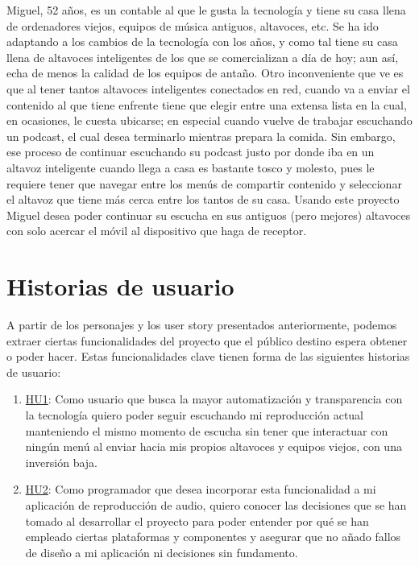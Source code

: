     Miguel, 52 años, es un contable al que le gusta la tecnología y tiene
    su casa llena de ordenadores viejos, equipos de música antiguos, altavoces,
    etc. Se ha ido adaptando a los cambios de la tecnología con los años, y como
    tal tiene su casa llena de altavoces inteligentes de los que se
    comercializan a día de hoy; aun así, echa de menos la calidad de los equipos
    de antaño. Otro inconveniente que ve es que al tener tantos altavoces
    inteligentes conectados en red, cuando va a enviar el contenido al que tiene
    enfrente tiene que elegir entre una extensa lista en la cual, en ocasiones,
    le cuesta ubicarse; en especial cuando vuelve de trabajar escuchando un
    podcast, el cual desea terminarlo mientras prepara la comida. Sin embargo,
    ese proceso de continuar escuchando su podcast justo por donde iba en un
    altavoz inteligente cuando llega a casa es bastante tosco y molesto, pues le
    requiere tener que navegar entre los menús de compartir contenido y
    seleccionar el altavoz que tiene más cerca entre los tantos de su casa.
    Usando este proyecto Miguel desea poder continuar su escucha en sus antiguos
    (pero mejores) altavoces con solo acercar el móvil al dispositivo que haga
    de receptor.



\section{Historias de usuario}
A partir de los personajes y los user story presentados anteriormente, podemos
extraer ciertas funcionalidades del proyecto que el público destino espera
obtener o poder hacer. Estas funcionalidades clave tienen forma de las
siguientes historias de usuario:

\begin{enumerate}
    \item
    \href{https://github.com/migueorg/One-touch-music-streaming-TFG-ETSIIT/issues/10}{HU1}:
    Como usuario que busca la mayor automatización y transparencia con la
    tecnología quiero poder seguir escuchando mi reproducción actual manteniendo
    el mismo momento de escucha sin tener que interactuar con ningún menú al
    enviar hacia mis propios altavoces y equipos viejos, con una inversión baja.
    \item
    \href{https://github.com/migueorg/One-touch-music-streaming-TFG-ETSIIT/issues/14}{HU2}:
    Como programador que desea incorporar esta funcionalidad a mi aplicación de
    reproducción de audio, quiero conocer las decisiones que se han tomado al
    desarrollar el proyecto para poder entender por qué se han empleado ciertas
    plataformas y componentes y asegurar que no añado fallos de diseño a mi
    aplicación ni decisiones sin fundamento.
\end{enumerate}


